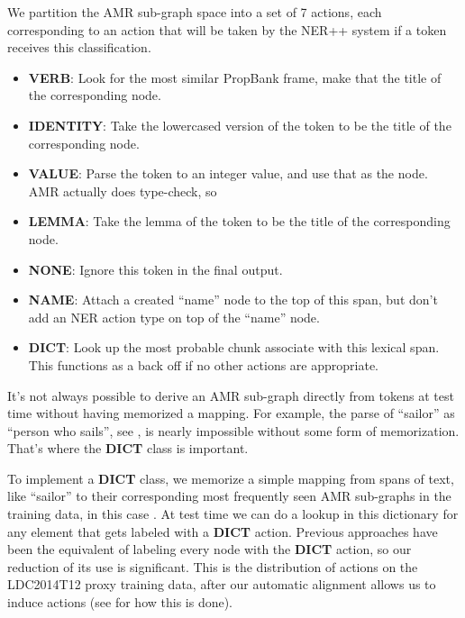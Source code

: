 \documentclass[11pt]{article}
\begin{document}

We partition the AMR sub-graph space into a set of 7 actions, each corresponding to an action that will be taken by the NER++ system if a token receives this classification.

\begin{itemize}
\item \textbf{VERB}: Look for the most similar PropBank frame, make that the title of the corresponding node.
\item \textbf{IDENTITY}: Take the lowercased version of the token to be the title of the corresponding node.
\item \textbf{VALUE}: Parse the token to an integer value, and use that as the node. AMR actually does type-check, so 
\item \textbf{LEMMA}: Take the lemma of the token to be the title of the corresponding node.
\item \textbf{NONE}: Ignore this token in the final output.
\item \textbf{NAME}: Attach a created ``name'' node to the top of this span, but don't add an NER action type on top of the ``name'' node.
\item \textbf{DICT}: Look up the most probable chunk associate with this lexical span. This functions as a back off if no other actions are appropriate.
\end{itemize}


It's not always possible to derive an AMR sub-graph directly from tokens at test time without having memorized a mapping. For example, the parse of ``sailor'' as ``person who sails'', see , is nearly impossible without some form of memorization. That's where the \textbf{DICT} class is important.

To implement a \textbf{DICT} class, we memorize a simple mapping from spans of text, like ``sailor'' to their corresponding most frequently seen AMR sub-graphs in the training data, in this case . At test time we can do a lookup in this dictionary for any element that gets labeled with a \textbf{DICT} action. Previous approaches have been the equivalent of labeling every node with the \textbf{DICT} action, so our reduction of its use is significant. This is the distribution of actions on the LDC2014T12 proxy training data, after our automatic alignment allows us to induce actions (see  for how this is done).
\end{document}
